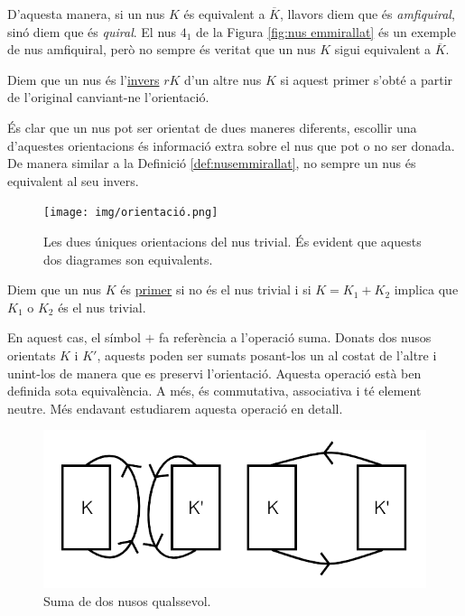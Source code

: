D'aquesta manera, si un nus $K$ és equivalent a $\overline{K}$, llavors diem que és \textit{amfiquiral}, sinó diem que és \textit{quiral}. El nus $4_1$ de la Figura \ref{fig:nus emmirallat} és un exemple de nus amfiquiral, però no sempre és veritat que un nus $K$ sigui equivalent a $\overline{K}$.

\begin{definition}\label{def:nusinvers}
	Diem que un nus és l'\underline{invers} $rK$ d'un altre nus $K$ si aquest primer s'obté a partir de l'original canviant-ne l'orientació.
\end{definition}

És clar que un nus pot ser orientat de dues maneres diferents, escollir una d'aquestes orientacions és informació extra sobre el nus que pot o no ser donada. De manera similar a la Definició \ref{def:nusemmirallat}, no sempre un nus és equivalent al  seu invers.

\begin{figure}
	\centering
	\texttt{[image: img/orientació.png]}
	\caption{Les dues úniques orientacions del nus trivial. És evident que aquests dos diagrames son equivalents.}\label{fig:nusorientat}
\end{figure}

\begin{definition}
	Diem que un nus $K$ és \underline{primer} si no és el nus trivial i si $K=K_1+K_2$ implica que $K_1$ o $K_2$ és el nus trivial.
\end{definition}

En aquest cas, el símbol $+$ fa referència a l'operació suma. Donats dos nusos orientats $K$ i $K'$, aquests poden ser sumats posant-los un al costat de l'altre i unint-los de manera que es preservi l'orientació. Aquesta operació està ben definida sota equivalència. A més, és commutativa, associativa i té element neutre. Més endavant estudiarem aquesta operació en detall.\\

\begin{figure}
	\centering
	\includegraphics[width=0.9\linewidth]{img/nussuma.png}
	\caption{Suma de dos nusos qualssevol.}\label{fig:nussuma}
\end{figure}

